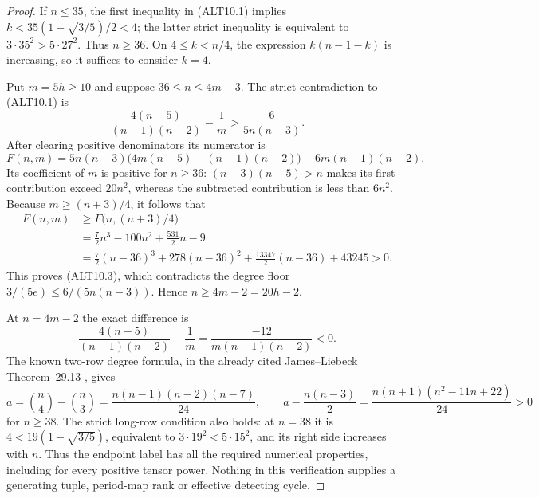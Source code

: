 \begin{proof}
If $n\le35$, the first inequality in (ALT10.1) implies
$k<35(1-\sqrt{3/5})/2<4$; the latter strict inequality
is equivalent to $3\cdot35^2>5\cdot27^2$.
Thus $n\ge36$. On $4\le k<n/4$, the expression
$k(n-1-k)$ is increasing, so it suffices to consider $k=4$.

Put $m=5h\ge10$ and suppose $36\le n\le4m-3$.
The strict contradiction to (ALT10.1) is
\[
 \frac{4(n-5)}{(n-1)(n-2)}-\frac1m
                              >\frac6{5n(n-3)}.         \tag{ALT10.3}
\]
After clearing positive denominators its numerator is
\[
 F(n,m)=5n(n-3)\bigl(4m(n-5)-(n-1)(n-2)\bigr)
                         -6m(n-1)(n-2).                 \tag{ALT10.4}
\]
Its coefficient of $m$ is positive for $n\ge36$:
$(n-3)(n-5)>n$ makes its first contribution exceed
$20n^2$, whereas the subtracted contribution is less
than $6n^2$. Because $m\ge(n+3)/4$, it follows that
\[
 \begin{split}
 F(n,m)&\ge F\bigl(n,(n+3)/4\bigr)\\
 &=\frac72n^3-100n^2+\frac{531}2n-9\\
 &=\frac72(n-36)^3+278(n-36)^2
                 +\frac{13347}2(n-36)+43245>0.
 \end{split}                                             \tag{ALT10.5}
\]
This proves (ALT10.3), which contradicts the degree floor
$3/(5e)\le6/(5n(n-3))$. Hence $n\ge4m-2=20h-2$.

At $n=4m-2$ the exact difference is
\[
 \frac{4(n-5)}{(n-1)(n-2)}-\frac1m
                    =\frac{-12}{m(n-1)(n-2)}<0.          \tag{ALT10.6}
\]
The known two-row degree formula, in the already cited
James--Liebeck Theorem~29.13 \cite{HD:JamesLiebeck2001}, gives
\[
 a=\binom n4-\binom n3=\frac{n(n-1)(n-2)(n-7)}{24},
 \qquad
 a-\frac{n(n-3)}2
       =\frac{n(n+1)(n^2-11n+22)}{24}>0                 \tag{ALT10.7}
\]
for $n\ge38$. The strict long-row condition also holds:
at $n=38$ it is $4<19(1-\sqrt{3/5})$, equivalent
to $3\cdot19^2<5\cdot15^2$, and its right side increases
with $n$. Thus the endpoint label has all the required
numerical properties, including for every positive tensor
power. Nothing in this verification supplies a generating
tuple, period-map rank or effective detecting cycle.
\end{proof}

